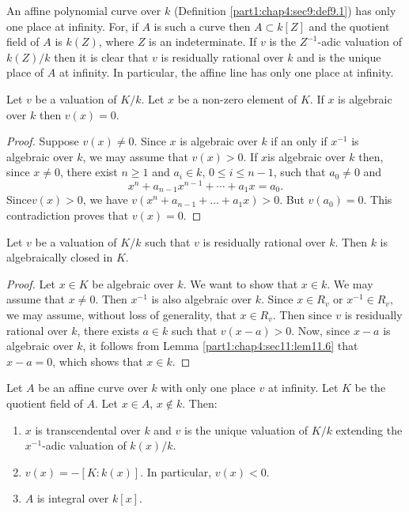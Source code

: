 \begin{example}\label{part1:chap4:sec11:exp11.5}
  An affine polynomial curve over $k$
  (Definition \ref{part1:chap4:sec9:def9.1}) has only one place at
  infinity. For, if $A$ is such a curve then $A \subset k[Z]$ and the
  quotient field of $A$ is $k(Z)$, where $Z$ is an indeterminate. If
  $v$ is the $Z^{-1}$-adic valuation of $k(Z)/k$ then it is clear that
  $v$ is residually rational over $k$ and is the unique place of $A$
  at infinity. In particular, the affine line has only one place at
  infinity. 
\end{example}

\begin{lemma}\label{part1:chap4:sec11:lem11.6}
  Let $v$ be a valuation of $K/k$. Let $x$ be a non-zero element of
  $K$. If $x$ is algebraic over $k$ then $v(x)=0$.
\end{lemma}

\begin{proof}
  Suppose $v(x) \neq 0$. Since $x$ is algebraic over $k$ if an only if
  $x^{-1}$ is algebraic over $k$, we may assume that $v(x)> 0$. If
  $x$is algebraic over $k$ then, since $x \neq 0$, there exist $n \geq
  1$ and $a_i \in k$, $0 \leq i \leq n-1$, such that $a_0 \neq 0$ and 
  $$
  x^n + a_{n-1} x^{n-1} + \cdots + a_1 x= a_0.
  $$
  Since\pageoriginale $v(x)> 0$, we have $v (x^n + a_{n-1}+ \ldots +
  a_1 x)>0$. But $v(a_0)=0$. This contradiction proves that $v(x)=0$.
\end{proof}

\begin{lemma}\label{part1:chap4:sec11:lem11.7}
  Let $v$ be a valuation of $K/k$ such that $v$ is residually rational
  over $k$. Then $k$ is algebraically closed in $K$.
\end{lemma}

\begin{proof}
  Let $x \in K$ be algebraic over $k$. We want to show that $x \in
  k$. We may assume that $x \neq 0$. Then $x^{-1}$ is also algebraic
  over $k$. Since $x \in R_v$ or $x^{-1} \in R_v$, we may assume,
  without loss of generality, that $x \in R_v$. Then since $v$ is
  residually rational over $k$, there exists $a \in k$ such that $v
  (x-a)> 0$. Now, since $x-a$ is algebraic over $k$, it follows from
  Lemma \ref{part1:chap4:sec11:lem11.6} that $x-a=0$, which shows that
  $x \in k$.
\end{proof}

\begin{lemma}\label{part1:chap4:sec11:lem11.8}
  Let $A$ be an affine curve over $k$ with only one place $v$ at
  infinity. Let $K$ be the quotient field of $A$. Let $x \in A$, $x
  \notin k$. Then:
  \begin{enumerate}[\rm (i)]
    \item $x$ is transcendental over $k$ and $v$ is the unique
      valuation of $K/k$ extending the $x^{-1}$-adic valuation of
      $k(x)/k$.
      \item $v(x) =- [K : k(x)]$. In particular, $v(x)<0$.
        \item $A$ is integral over $k[x]$.
  \end{enumerate}
\end{lemma}

